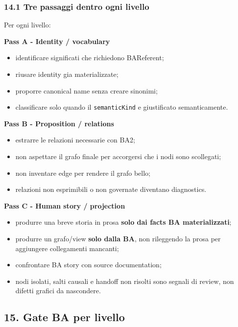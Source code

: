 \documentclass[
  9pt,
  a4paper,
]{article}
\providecommand{\tightlist}{%
  \setlength{\itemsep}{0pt}\setlength{\parskip}{0pt}}
\begin{document}
\subsubsection{14.1 Tre passaggi dentro ogni
livello}\label{tre-passaggi-dentro-ogni-livello}

Per ogni livello:

\textbf{Pass A - Identity / vocabulary}

\begin{itemize}
\tightlist
\item
  identificare significati che richiedono BAReferent;
\item
  riusare identity gia materializzate;
\item
  proporre canonical name senza creare sinonimi;
\item
  classificare solo quando il \texttt{semanticKind} e giustificato
  semanticamente.
\end{itemize}

\textbf{Pass B - Proposition / relations}

\begin{itemize}
\tightlist
\item
  estrarre le relazioni necessarie con BA2;
\item
  non aspettare il grafo finale per accorgersi che i nodi sono
  scollegati;
\item
  non inventare edge per rendere il grafo bello;
\item
  relazioni non esprimibili o non governate diventano diagnostics.
\end{itemize}

\textbf{Pass C - Human story / projection}

\begin{itemize}
\tightlist
\item
  produrre una breve storia in prosa \textbf{solo dai facts BA
  materializzati};
\item
  produrre un grafo/view \textbf{solo dalla BA}, non rileggendo la prosa
  per aggiungere collegamenti mancanti;
\item
  confrontare BA story con source documentation;
\item
  nodi isolati, salti causali e handoff non risolti sono segnali di
  review, non difetti grafici da nascondere.
\end{itemize}

\subsection{15. Gate BA per livello}\label{gate-ba-per-livello}
\end{document}
